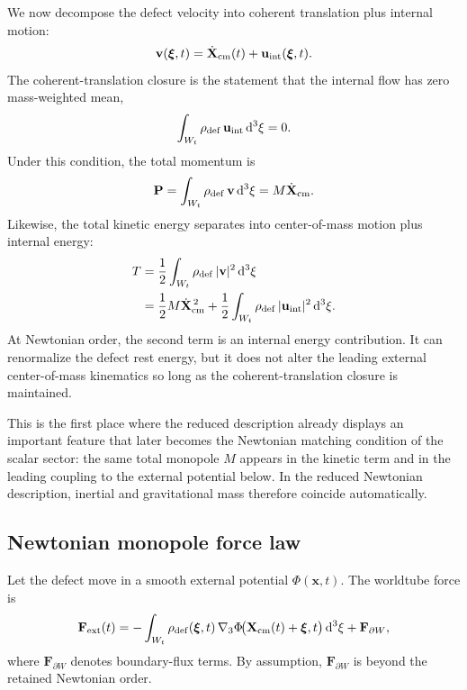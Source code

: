 \documentclass[11pt]{article}
\newcommand{\dd}{\mathrm d}
\newcommand{\x}{\mathbf x}
\newcommand{\vct}{\mathbf v}
\newcommand{\gradThree}{\nabla_3}
\newcommand{\PhiN}{\Phi}
\begin{document}
We now decompose the defect velocity into coherent translation plus internal motion:
\begin{equation}
\vct(\boldsymbol{\xi},t)
=
\dot{\mathbf X}_{\rm cm}(t)
+
\mathbf u_{\rm int}(\boldsymbol{\xi},t).
\label{eq:defect-velocity-split}
\end{equation}
The coherent-translation closure is the statement that the internal flow has zero
mass-weighted mean,
\begin{equation}
\int_{W_t}\rho_{\rm def}\,\mathbf u_{\rm int}\,\dd^3\xi = 0.
\label{eq:coherent-translation-closure}
\end{equation}
Under this condition, the total momentum is
\begin{equation}
\mathbf P
=
\int_{W_t}\rho_{\rm def}\,\vct\,\dd^3\xi
=
M\dot{\mathbf X}_{\rm cm}.
\label{eq:defect-total-momentum}
\end{equation}
Likewise, the total kinetic energy separates into center-of-mass motion plus internal
energy:
\begin{align}
T
&=
\frac12\int_{W_t}\rho_{\rm def}\,|\vct|^2\,\dd^3\xi
\nonumber\\
&=
\frac12 M\dot{\mathbf X}_{\rm cm}^{\,2}
+
\frac12\int_{W_t}\rho_{\rm def}\,|\mathbf u_{\rm int}|^2\,\dd^3\xi.
\label{eq:defect-kinetic-split}
\end{align}
At Newtonian order, the second term is an internal energy contribution. It can renormalize
the defect rest energy, but it does not alter the leading external center-of-mass
kinematics so long as the coherent-translation closure is maintained.

This is the first place where the reduced description already displays an important
feature that later becomes the Newtonian matching condition of the scalar sector:
the same total monopole \(M\) appears in the kinetic term and in the leading coupling to
the external potential below. In the reduced Newtonian description, inertial and
gravitational mass therefore coincide automatically.

\subsection{Newtonian monopole force law}
\label{sec:monopole-force}

Let the defect move in a smooth external potential \(\PhiN(\x,t)\). The worldtube force is
\begin{equation}
\mathbf F_{\rm ext}(t)
=
-\int_{W_t}\rho_{\rm def}(\boldsymbol{\xi},t)\,
\gradThree \PhiN\!\bigl(\mathbf X_{\rm cm}(t)+\boldsymbol{\xi},t\bigr)\,\dd^3\xi
+
\mathbf F_{\partial W},
\label{eq:worldtube-force}
\end{equation}
where \(\mathbf F_{\partial W}\) denotes boundary-flux terms. By assumption,
\(\mathbf F_{\partial W}\) is beyond the retained Newtonian order.
\end{document}
